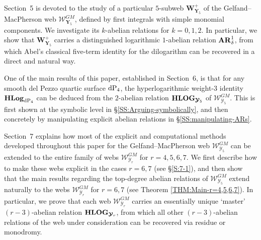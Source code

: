 \documentclass[11pt]{amsart}
\begin{document}
 
 
 
 

Section~5 is devoted to the study of a particular $5$-subweb $ \boldsymbol{W}^{+}_{ \boldsymbol{Y}_5} $ of the Gelfand--MacPherson web $ \boldsymbol{\mathcal W}^{GM}_{ \boldsymbol{Y}_5} $, defined by first integrals with simple monomial components. We investigate its $k$-abelian relations for $k = 0,1,2$. In particular, we show that 
$ \boldsymbol{W}^{+}_{ \boldsymbol{Y}_5} $ carries a distinguished logarithmic $1$-abelian relation ${\bf AR}^1_\delta$, from which Abel's classical five-term identity for the dilogarithm can be recovered in a direct and natural way.




One of the main results of this paper, established in Section~6, is that for any smooth del Pezzo quartic surface ${\rm dP}_4$, the hyperlogarithmic weight-$3$ identity  ${\bf HLog}_{{\rm dP}_4}$  can be deduced from the $2$-abelian relation ${\bf HLOG}_{\boldsymbol{\mathcal Y}_5}$  of $ \boldsymbol{\mathcal W}^{GM}_{ \boldsymbol{\mathcal Y}_5} $. This is first shown at the symbolic level in \S\ref{SS:Arguing-symbolically}, and then concretely by manipulating explicit abelian relations in \S\ref{SS:manipulating-ARs}.  



Section~7 explains how most of the explicit and computational methods developed throughout this paper for the Gelfand--MacPherson web 
$ \boldsymbol{\mathcal W}^{GM}_{ \boldsymbol{\mathcal Y}_5} $
 can be extended to the entire family of webs $ \boldsymbol{\mathcal W}^{GM}_{ \boldsymbol{\mathcal Y}_r} $ for $r = 4, 5, 6, 7$. We first describe how to make these webs explicit in the cases $r = 6,7$ 
  (see \S\ref{S:7-1}), 
 and then show that the main results regarding the top-degree abelian relations of 
$ \boldsymbol{\mathcal W}^{GM}_{ \boldsymbol{\mathcal Y}_5} $ 
 extend naturally to the webs $ \boldsymbol{\mathcal W}^{GM}_{ \boldsymbol{\mathcal Y}_r} $ for $r = 6,7$ (see Theorem \ref{THM:Main-r=4,5,6,7}). In particular, we prove that each web $ \boldsymbol{\mathcal W}^{GM}_{ \boldsymbol{\mathcal Y}_r} $ carries an essentially unique `master' $(r{-}3)$-abelian relation ${\bf HLOG}_{\boldsymbol{\mathcal Y}_r }$, from which all other $(r-3)$-abelian relations of the web under consideration can be recovered via residue or monodromy.
\end{document}
